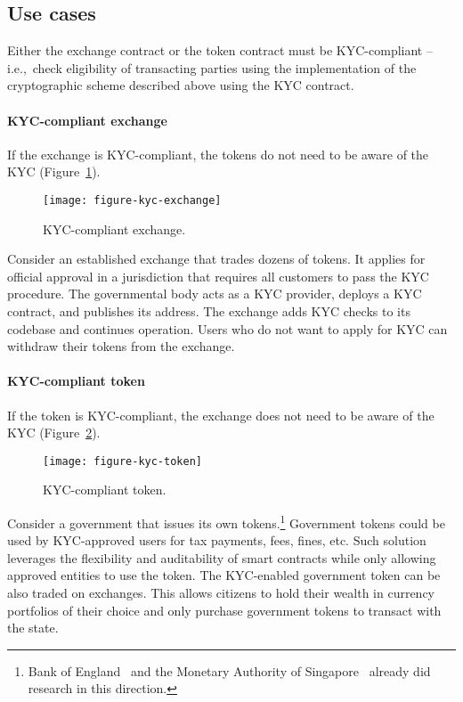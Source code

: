 \subsection{Use cases}

Either the exchange contract or the token contract must be KYC-compliant -- i.e.,~check eligibility of transacting parties using the implementation of the cryptographic scheme described above using the KYC contract.

\paragraph{KYC-compliant exchange}

If the exchange is KYC-compliant, the tokens do not need to be aware of the KYC (Figure~\ref{fig:KYCCompliantExchange}).

\begin{figure}[h]
	\centering
	\texttt{[image: figure-kyc-exchange]}
	\caption{KYC-compliant exchange.}
	\label{fig:KYCCompliantExchange}
\end{figure}

Consider an established exchange that trades dozens of tokens.
It applies for official approval in a jurisdiction that requires all customers to pass the KYC procedure.
The governmental body acts as a KYC provider, deploys a KYC contract, and publishes its address.
The exchange adds KYC checks to its codebase and continues operation.
Users who do not want to apply for KYC can withdraw their tokens from the exchange.


\paragraph{KYC-compliant token}

If the token is KYC-compliant, the exchange does not need to be aware of the KYC (Figure~\ref{fig:KYCCompliantToken}).

\begin{figure}[h]
	\centering
	\texttt{[image: figure-kyc-token]}
	\caption{KYC-compliant token.}
	\label{fig:KYCCompliantToken}
\end{figure}

Consider a government that issues its own tokens.\footnote{Bank of England~\cite{Danezis2016} and the Monetary Authority of Singapore~\cite{Singapore17} already did research in this direction.}
Government tokens could be used by KYC-approved users for tax payments, fees, fines, etc.
Such solution leverages the flexibility and auditability of smart contracts while only allowing approved entities to use the token.
The KYC-enabled government token can be also traded on exchanges.
This allows citizens to hold their wealth in currency portfolios of their choice and only purchase government tokens to transact with the state.

